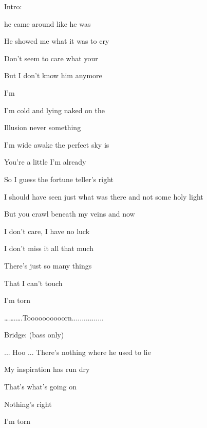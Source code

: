 
Intro: 

    

\zs

             he came around like he was 

            He showed me what it was to cry


             Don't seem to care what your 

            But I don't know him anymore 





                 I'm 
\ks

\zr
               

             I'm cold and  lying naked on the 

             Illusion never  something 

             I'm wide awake  the perfect sky is 

             You're a little  I'm already  
\kr

\zs
            So I guess the fortune teller's right

            I should have seen just what was there and not some holy light

            But you crawl beneath my veins and now

                I don't care, I have no luck

                I don't miss it all that much 

                There's just so many things

                That I can't touch

                I'm torn
\ks

\zr
\kr
             …….….Toooooooooorn................

Bridge: (bass only)

           ...  Hoo ...  
\zs
                 There's nothing where he used to lie

                 My inspiration has run dry

                 That's what's going on

                 Nothing's right

            I'm torn
\ks

\zr
\kr

\kp
